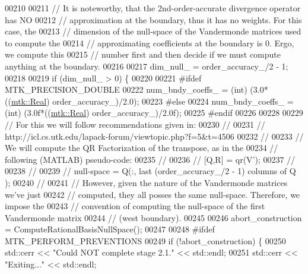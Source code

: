 \begin{DoxyCode}
00210 
00211   \textcolor{comment}{// It is noteworthy, that the 2nd-order-accurate divergence operator has NO}
00212   \textcolor{comment}{// approximation at the boundary, thus it has no weights. For this case, the}
00213   \textcolor{comment}{// dimension of the null-space of the Vandermonde matrices used to compute the}
00214   \textcolor{comment}{// approximating coefficients at the boundary is 0. Ergo, we compute this}
00215   \textcolor{comment}{// number first and then decide if we must compute anything at the boundary.}
00216 
00217   dim\_null\_ = order\_accuracy\_/2 - 1;
00218 
00219   \textcolor{keywordflow}{if} (dim\_null\_ > 0) \{
00220 
00221 \textcolor{preprocessor}{    #ifdef MTK\_PRECISION\_DOUBLE}
00222     num\_bndy\_coeffs\_ = (int) (3.0*((\hyperlink{group__c01-roots_gac080bbbf5cbb5502c9f00405f894857d}{mtk::Real}) order\_accuracy\_)/2.0);
00223 \textcolor{preprocessor}{    #else}
00224     num\_bndy\_coeffs\_ = (int) (3.0f*((\hyperlink{group__c01-roots_gac080bbbf5cbb5502c9f00405f894857d}{mtk::Real}) order\_accuracy\_)/2.0f);
00225 \textcolor{preprocessor}{    #endif}
00226 
00228 
00229     \textcolor{comment}{// For this we will follow recommendations given in:}
00230     \textcolor{comment}{//}
00231     \textcolor{comment}{// http://icl.cs.utk.edu/lapack-forum/viewtopic.php?f=5&t=4506}
00232     \textcolor{comment}{//}
00233     \textcolor{comment}{// We will compute the QR Factorization of the transpose, as in the}
00234     \textcolor{comment}{// following (MATLAB) pseudo-code:}
00235     \textcolor{comment}{//}
00236     \textcolor{comment}{// [Q,R] = qr(V'); %
00237     \textcolor{comment}{// %
00238     \textcolor{comment}{//}
00239     \textcolor{comment}{// null-space = Q(:, last (order\_accuracy\_/2 - 1) columns of Q );}
00240     \textcolor{comment}{//}
00241     \textcolor{comment}{// However, given the nature of the Vandermonde matrices we've just}
00242     \textcolor{comment}{// computed, they all posses the same null-space. Therefore, we impose the}
00243     \textcolor{comment}{// convention of computing the null-space of the first Vandermonde matrix}
00244     \textcolor{comment}{// (west boundary).}
00245 
00246     abort\_construction = ComputeRationalBasisNullSpace();
00247 
00248 \textcolor{preprocessor}{    #ifdef MTK\_PERFORM\_PREVENTIONS}
00249     \textcolor{keywordflow}{if} (!abort\_construction) \{
00250       std::cerr << \textcolor{stringliteral}{"Could NOT complete stage 2.1."} << std::endl;
00251       std::cerr << \textcolor{stringliteral}{"Exiting..."} << std::endl;
}}
\end{DoxyCode}
